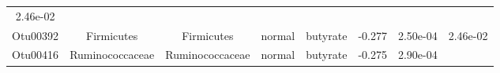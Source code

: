 \documentclass[11pt,]{article}
\begin{document}
\begin{longtable}[]{@{}cccccccc@{}}
\begin{minipage}[t]{0.08\columnwidth}
2.46e-02\strut
\end{minipage}\tabularnewline
\begin{minipage}[t]{0.08\columnwidth}\centering\strut
Otu00392\strut
\end{minipage} & \begin{minipage}[t]{0.15\columnwidth}\centering\strut
Firmicutes\strut
\end{minipage} & \begin{minipage}[t]{0.15\columnwidth}\centering\strut
Firmicutes\strut
\end{minipage} & \begin{minipage}[t]{0.08\columnwidth}\centering\strut
normal\strut
\end{minipage} & \begin{minipage}[t]{0.09\columnwidth}\centering\strut
butyrate\strut
\end{minipage} & \begin{minipage}[t]{0.07\columnwidth}\centering\strut
-0.277\strut
\end{minipage} & \begin{minipage}[t]{0.08\columnwidth}\centering\strut
2.50e-04\strut
\end{minipage} & \begin{minipage}[t]{0.08\columnwidth}\centering\strut
2.46e-02\strut
\end{minipage}\tabularnewline
\begin{minipage}[t]{0.08\columnwidth}\centering\strut
Otu00416\strut
\end{minipage} & \begin{minipage}[t]{0.15\columnwidth}\centering\strut
Ruminococcaceae\strut
\end{minipage} & \begin{minipage}[t]{0.15\columnwidth}\centering\strut
Ruminococcaceae\strut
\end{minipage} & \begin{minipage}[t]{0.08\columnwidth}\centering\strut
normal\strut
\end{minipage} & \begin{minipage}[t]{0.09\columnwidth}\centering\strut
butyrate\strut
\end{minipage} & \begin{minipage}[t]{0.07\columnwidth}\centering\strut
-0.275\strut
\end{minipage} & \begin{minipage}[t]{0.08\columnwidth}\centering\strut
2.90e-04\strut
\end{minipage} & \begin{minipage}[t]{0.08\columnwidth}\centering\strut

\end{minipage}
\end{longtable}
\end{document}
